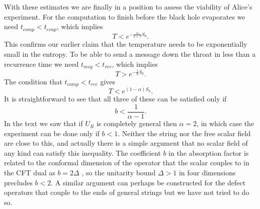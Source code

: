\documentclass[12pt]{article}
\newcommand{\be}{\begin{equation}}
\newcommand{\ee}{\end{equation}}
\begin{document}
With these estimates we are finally in a position to assess the viability of Alice's experiment.  For the computation to finish before the black hole evaporates we need $t_{comp}<t_{evap}$, which implies
\be
T < e^{-\frac{\alpha}{b+1}S_0}.
\ee
This confirms our earlier claim that the temperature needs to be exponentially small in the entropy.  To be able to send a message down the throat in less than a recurrence time we need $t_{msg}<t_{rec}$, which implies
\be
T> e^{-\frac{1}{b}S_0}.
\ee
The condition that $t_{comp}<t_{rec}$ gives
\be
T<e^{(1-\alpha)S_0}.
\ee
It is straightforward to see that all three of these can be satisfied only if 
\be
b<\frac{1}{\alpha-1}.
\ee
In the text we saw that if $U_R$ is completely general then $\alpha=2$, in which case the experiment can be done only if $b<1$.  Neither the string nor the free scalar field are close to this, and actually there is a simple argument that no scalar field of any kind can satisfy this inequality.  The coefficient $b$ in the absorption factor is related to the conformal dimension of the operator that the scalar couples to in the CFT dual as $b=2\Delta$ \cite{igor2}, so the unitarity bound $\Delta>1$ in four dimensions precludes $b<2$.  A similar argument can perhaps be constructed for the defect operators that couple to the ends of general strings but we have not tried to do so.  
\end{document}
